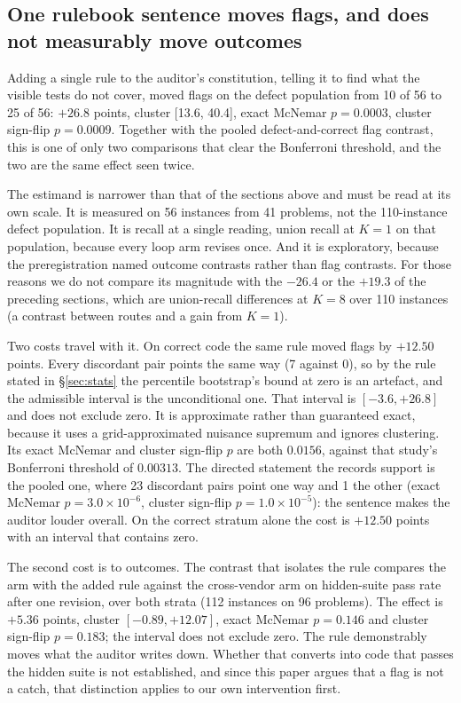 \subsection{One rulebook sentence moves flags, and does not measurably move outcomes}
\label{sec:rulebook}

Adding a single rule to the auditor's constitution, telling it to find what the visible tests do
not cover, moved flags on the defect population from 10 of 56 to 25 of 56: $+26.8$ points, cluster
[13.6, 40.4], exact McNemar $p = 0.0003$, cluster sign-flip $p = 0.0009$. Together with the pooled
defect-and-correct flag contrast, this is one of only two comparisons that clear the Bonferroni
threshold, and the two are the same effect seen twice.

The estimand is narrower than that of the sections above and must be read at its own scale. It is measured
on 56 instances from 41 problems, not the 110-instance defect population. It is recall at a single
reading, union recall at $K = 1$ on that population, because every loop arm revises once. And it
is exploratory, because the preregistration named outcome contrasts rather than flag contrasts. For
those reasons we do not compare its magnitude with the $-26.4$ or the $+19.3$ of the preceding
sections, which are union-recall differences at $K=8$ over 110 instances (a contrast between
routes and a gain from $K=1$).

Two costs travel with it. On correct code the same rule moved flags by $+12.50$ points. Every
discordant pair points the same way (7 against 0), so by the rule stated in \S\ref{sec:stats} the
percentile bootstrap's bound at zero is an artefact, and the admissible interval is the
unconditional one. That interval is $[-3.6, +26.8]$ and does not exclude zero. It is approximate
rather than guaranteed exact, because it uses a grid-approximated nuisance supremum and ignores
clustering. Its exact McNemar and cluster sign-flip $p$ are both $0.0156$, against that study's
Bonferroni threshold of $0.00313$. The directed statement the records
support is the pooled one, where 23 discordant pairs point one way and 1 the other (exact McNemar
$p = 3.0\times10^{-6}$, cluster sign-flip $p = 1.0\times10^{-5}$): the sentence makes the auditor
louder overall. On the correct stratum alone the cost is $+12.50$ points with an interval that
contains zero.

The second cost is to outcomes. The contrast that isolates the rule compares the arm with the
added rule against the cross-vendor arm on hidden-suite pass rate after one revision, over both
strata (112 instances on 96 problems). The effect is $+5.36$ points, cluster $[-0.89, +12.07]$,
exact McNemar $p = 0.146$ and cluster sign-flip $p = 0.183$; the interval does not exclude zero. The rule demonstrably moves what
the auditor writes down. Whether that converts into code that passes the hidden suite is not
established, and since this paper argues that a flag is not a catch, that distinction applies to
our own intervention first.


